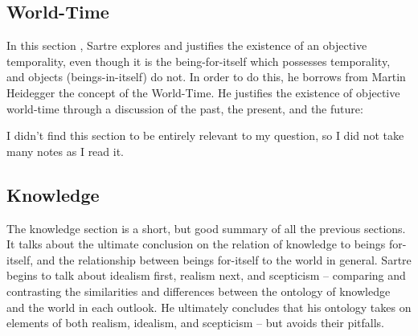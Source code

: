 \subsection{World-Time}

In this section \autocite[285 -- 300]{sartre}, Sartre explores and justifies the existence of an objective temporality, even though it is the being-for-itself which possesses temporality, and objects (beings-in-itself) do not. In order to do this, he borrows from Martin Heidegger the concept of the World-Time. He justifies the existence of objective world-time through a discussion of the past, the present, and the future:

\noindent
{}

\noindent
I didn't find this section to be entirely relevant to my question, so I did not take many notes as I read it.

\subsection{Knowledge}

The knowledge section \autocite[300 -- 303]{sartre} is a short, but good summary of all the previous sections. It talks about the ultimate conclusion on the relation of knowledge to beings for-itself, and the relationship between beings for-itself to the world in general. Sartre begins to talk about idealism first, realism next, and scepticism -- comparing and contrasting the similarities and differences between the ontology of knowledge and the world in each outlook. He ultimately concludes that his ontology takes on elements of both realism, idealism, and scepticism -- but avoids their pitfalls.

